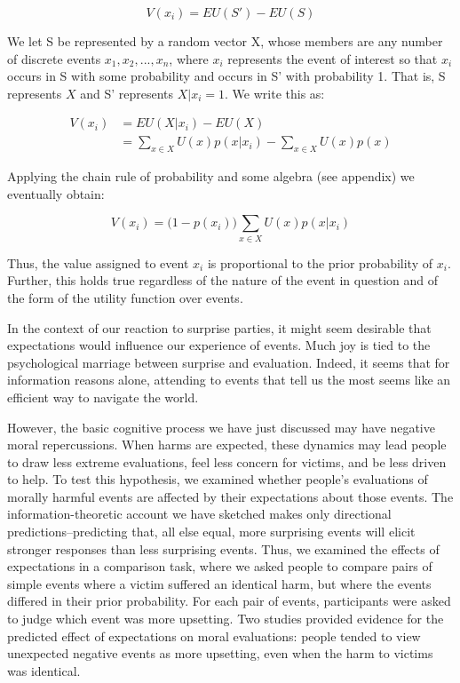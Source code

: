 \documentclass[12pt,]{article}
\begin{document}
\[ V(x_i) = EU(S') -EU(S) \]

We let S be represented by a random vector X, whose members are any
number of discrete events \(x_1, x_2, ..., x_n\), where \(x_i\)
represents the event of interest so that \(x_i\) occurs in S with some
probability and occurs in S' with probability 1. That is, S represents
\(X\) and S' represents \(X|x_i=1\). We write this as:

\[
\begin{aligned}
V(x_i) &= EU(X|x_i) - EU(X) \\
&= \sum_{x \in X} U(x)p(x|x_i) - \sum_{x \in X} U(x)p(x)
\end{aligned}\]

Applying the chain rule of probability and some algebra (see appendix)
we eventually obtain:

\[V(x_i) = \big(1 - p(x_i) \big) \sum_{x \in X} U(x)p(x|x_i)\]

Thus, the value assigned to event \(x_i\) is proportional to the prior
probability of \(x_i\). Further, this holds true regardless of the
nature of the event in question and of the form of the utility function
over events.

In the context of our reaction to surprise parties, it might seem
desirable that expectations would influence our experience of events.
Much joy is tied to the psychological marriage between surprise and
evaluation. Indeed, it seems that for information reasons alone,
attending to events that tell us the most seems like an efficient way to
navigate the world.

However, the basic cognitive process we have just discussed may have
negative moral repercussions. When harms are expected, these dynamics
may lead people to draw less extreme evaluations, feel less concern for
victims, and be less driven to help. To test this hypothesis, we
examined whether people's evaluations of morally harmful events are
affected by their expectations about those events. The
information-theoretic account we have sketched makes only directional
predictions--predicting that, all else equal, more surprising events
will elicit stronger responses than less surprising events. Thus, we
examined the effects of expectations in a comparison task, where we
asked people to compare pairs of simple events where a victim suffered
an identical harm, but where the events differed in their prior
probability. For each pair of events, participants were asked to judge
which event was more upsetting. Two studies provided evidence for the
predicted effect of expectations on moral evaluations: people tended to
view unexpected negative events as more upsetting, even when the harm to
victims was identical.
\end{document}
